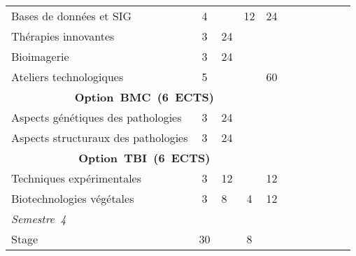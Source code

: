 \begin{tabular}{|m{5cm}|cm{0.75cm}|cm{0.75cm}|cm{0.75cm}|cm{0.75cm}|cm{0.75cm}|}
 \color{black} Bases de données et SIG & \color{black} 4 & \color{black} & \color{black} 12 & \color{black} 24 \\ \cline{1-5}

 \cellcolor{couleurClaire} \color{couleurTexte} Thérapies innovantes & \cellcolor{couleurClaire} \color{couleurTexte} 3 & \cellcolor{couleurClaire} \color{couleurTexte} 24 & \cellcolor{couleurClaire} \color{couleurTexte} & \cellcolor{couleurClaire} \color{couleurTexte} \\ \cline{1-5}

 \color{black} Bioimagerie & \color{black} 3 & \color{black} 24 & \color{black} & \color{black} \\ \cline{1-5}

 \cellcolor{couleurClaire} \color{couleurTexte} Ateliers technologiques & \cellcolor{couleurClaire} \color{couleurTexte} 5 & \cellcolor{couleurClaire} \color{couleurTexte} & \cellcolor{couleurClaire} \color{couleurTexte} & \cellcolor{couleurClaire} \color{couleurTexte} 60 \\ \cline{1-5}

\multicolumn{5}{|c|}{\color{black} \mbox{\textbf{Option BMC (6 ECTS)}}}  \\ \cline{1-5}

 \color{black} Aspects génétiques des pathologies & \color{black} 3 & \color{black} 24 & \color{black} & \color{black} \\ \cline{1-5}

 \cellcolor{couleurClaire} \color{couleurTexte} Aspects structuraux des pathologies & \cellcolor{couleurClaire} \color{couleurTexte} 3 & \cellcolor{couleurClaire} \color{couleurTexte} 24 & \cellcolor{couleurClaire} \color{couleurTexte} & \cellcolor{couleurClaire} \color{couleurTexte} \\ \cline{1-5}

\multicolumn{5}{|c|}{\color{black} \mbox{\textbf{Option TBI (6 ECTS)}}}  \\ \cline{1-5}

 \color{black} Techniques expérimentales  & \color{black} 3 & \color{black} 12& \color{black} & \color{black} 12 \\ \cline{1-5}

 \cellcolor{couleurClaire} \color{couleurTexte} Biotechnologies végétales  & \cellcolor{couleurClaire} \color{couleurTexte} 3 & \cellcolor{couleurClaire} \color{couleurTexte} 8 & \cellcolor{couleurClaire} \color{couleurTexte} 4 & \cellcolor{couleurClaire} \color{couleurTexte} 12 \\ \cline{1-5}

\cline{1-5} 
\multicolumn{5}{l}{\color{black} \mbox{\textit{Semestre 4}}}  \\ \cline{1-5}

 \color{black} Stage  & \color{black} 30 & \color{black} & \color{black} 8 & \color{black} \\ \cline{1-5}

\end{tabular}

